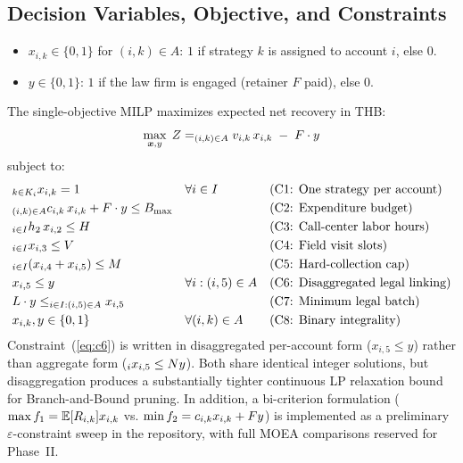 \documentclass[10pt,a4paper]{article}
\let\sum\relax
\begin{document}
\subsection{Decision Variables, Objective, and Constraints}
\begin{itemize}
    \item $x_{i,k} \in \{0,1\}$ for $(i,k) \in A$: $1$ if strategy $k$ is assigned to account $i$, else $0$.
    \item $y \in \{0,1\}$: $1$ if the law firm is engaged (retainer $F$ paid), else $0$.
\end{itemize}
The single-objective MILP maximizes expected net recovery in THB:
\begin{equation}
    \max_{\bm{x}, y} \; Z = \sum_{(i,k) \in A} v_{i,k} \, x_{i,k} \;-\; F \cdot y
\end{equation}
subject to:
\begin{align}
    &\sum_{k \in K_i} x_{i,k} = 1 && \forall i \in I && \text{(C1: One strategy per account)} \label{eq:c1} \\
    &\sum_{(i,k) \in A} c_{i,k} \, x_{i,k} + F \cdot y \le B_{\max} && && \text{(C2: Expenditure budget)} \label{eq:c2} \\
    &\sum_{i \in I} h_2 \, x_{i,2} \le H && && \text{(C3: Call-center labor hours)} \label{eq:c3} \\
    &\sum_{i \in I} x_{i,3} \le V && && \text{(C4: Field visit slots)} \label{eq:c4} \\
    &\sum_{i \in I} (x_{i,4} + x_{i,5}) \le M && && \text{(C5: Hard-collection cap)} \label{eq:c5} \\
    &x_{i,5} \le y && \forall i : (i,5) \in A && \text{(C6: Disaggregated legal linking)} \label{eq:c6} \\
    &L \cdot y \le \sum_{i \in I : (i,5) \in A} x_{i,5} && && \text{(C7: Minimum legal batch)} \label{eq:c7} \\
    &x_{i,k}, y \in \{0, 1\} && \forall (i,k) \in A && \text{(C8: Binary integrality)} \label{eq:c8}
\end{align}
Constraint~(\ref{eq:c6}) is written in disaggregated per-account form ($x_{i,5} \le y$) rather than aggregate form ($\sum_i x_{i,5} \le N y$). Both share identical integer solutions, but disaggregation produces a substantially tighter continuous LP relaxation bound for Branch-and-Bound pruning. In addition, a bi-criterion formulation ($\max f_1 = \sum \mathbb{E}[R_{i,k}]x_{i,k}$ vs. $\min f_2 = \sum c_{i,k}x_{i,k} + Fy$) is implemented as a preliminary $\varepsilon$-constraint sweep in the repository, with full MOEA comparisons reserved for Phase~II.
\end{document}
